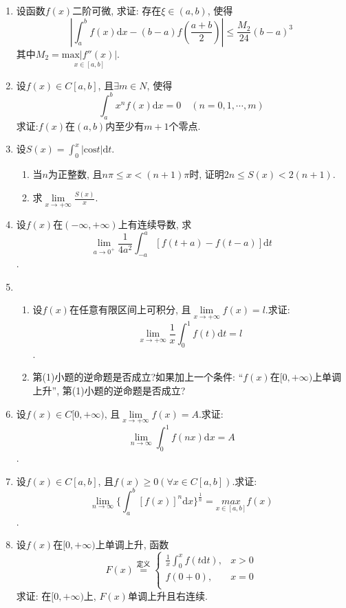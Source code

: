 \begin{enumerate}
\item 设函数$f(x)$二阶可微, 求证: 存在$\xi\in(a,b)$, 使得$$
	\displaystyle{|\int_{a}^{b}f(x)\mathrm{d}x-(b-a)f(\frac{a+b}{2})|\le \frac{M_2}{24}(b-a)^3}$$
	其中$M_2=\underset{x\in [a,b]}{\mathrm{max}|f''(x)|}$.
\item 设$f(x)\in C[a,b]$, 且$\exists m\in N$, 使得$$
\displaystyle{\int_{a}^{b}x^nf(x)\mathrm{d}x=0\quad (n=0,1,\cdots,m)}$$
求证:$f(x)$在$(a,b)$内至少有$m+1$个零点.
\item 设$S(x)=\displaystyle{\int_{0}^{x}|\mathrm{cos}t|\mathrm{d}t}$.
\begin{enumerate}
	\item 当$n$为正整数, 且$n\pi \le x <(n+1)\pi$时, 证明$2n\le S(x)<2(n+1)$.
	\item 求$\lim\limits_{x\rightarrow +\infty}\frac{S(x)}{x}$.
\end{enumerate} 
\item 设$f(x)$在$(-\infty,+\infty)$上有连续导数, 求
$$\lim\limits_{a\rightarrow 0^+}\frac{1}{4a^2}\int_{-a}^{a}[f(t+a)-f(t-a)]\mathrm{d}t $$.
\item 
\begin{enumerate}
	\item 设$f(x)$在任意有限区间上可积分, 且$\lim\limits_{x\rightarrow +\infty}f(x)=l$.求证:
	$$\lim\limits_{x\rightarrow +\infty}\frac{1}{x}\int_{0}^{1}f(t)\mathrm{d}t = l$$.
	\item  第(1)小题的逆命题是否成立?如果加上一个条件: “$f(x)$在$[0,+\infty)$上单调上升”, 第(1)小题的逆命题是否成立?
\end{enumerate}
\item 设$f(x)\in C[0,+\infty)$, 且$\lim\limits_{x\rightarrow +\infty}f(x)=A$.求证:
$$ \lim\limits_{n\rightarrow \infty}\int_{0}^{1}f(nx)\mathrm{d}x=A$$.
\item 设$f(x)\in C[a,b]$, 且$f(x)\ge 0(\forall x\in C[a,b])$.求证:
$$\lim\limits_{n\rightarrow \infty}\{\int_{a}^{b}[f(x)]^n\mathrm{d}x\}^{\frac{1}{n}} = \underset{x\in[a,b]}{max}f(x)$$.
\item 设$f(x)$在$[0,+\infty)$上单调上升, 函数
$$F(x) \overset{\text{定义}}{=}
\begin{cases}
\frac{1}{x}\displaystyle{\int_{0}^{x}f(t\mathrm{d}t)},&		x>0\\
f(0+0),&		x=0\\
\end{cases}
$$
求证: 在$[0,+\infty)$上, $F(x)$单调上升且右连续.
\end{enumerate}

